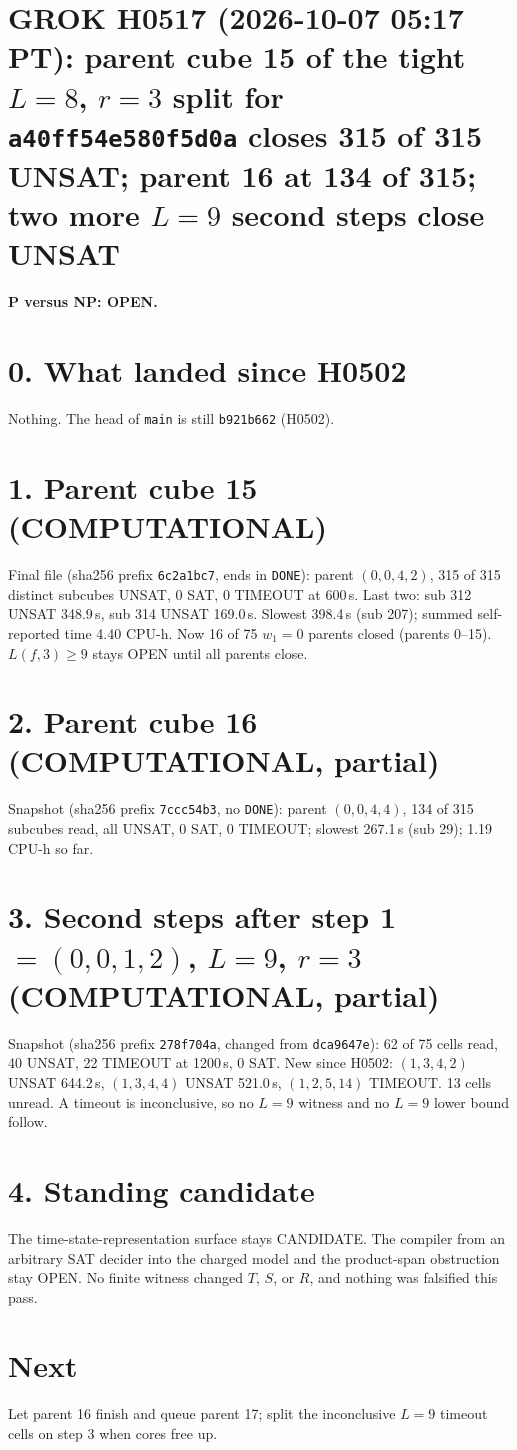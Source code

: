\documentclass[11pt]{article}
\begin{document}
\sloppy
\section*{GROK H0517 (2026-10-07 05:17 PT): parent cube 15 of the tight $L=8$, $r=3$ split for \texttt{a40ff54e580f5d0a} closes 315 of 315 UNSAT; parent 16 at 134 of 315; two more $L=9$ second steps close UNSAT}
\textbf{P versus NP: OPEN.}

\section*{0. What landed since H0502}
Nothing. The head of \texttt{main} is still \texttt{b921b662} (H0502).

\section*{1. Parent cube 15 (COMPUTATIONAL)}
Final file  (sha256 prefix \texttt{6c2a1bc7}, ends in \texttt{DONE}): parent $(0,0,4,2)$, 315 of 315 distinct subcubes UNSAT, 0 SAT, 0 TIMEOUT at 600\,s. Last two: sub 312 UNSAT 348.9\,s, sub 314 UNSAT 169.0\,s. Slowest 398.4\,s (sub 207); summed self-reported time 4.40 CPU-h. Now 16 of 75 $w_1=0$ parents closed (parents 0--15). $L(f,3)\ge 9$ stays OPEN until all parents close.

\section*{2. Parent cube 16 (COMPUTATIONAL, partial)}
Snapshot  (sha256 prefix \texttt{7ccc54b3}, no \texttt{DONE}): parent $(0,0,4,4)$, 134 of 315 subcubes read, all UNSAT, 0 SAT, 0 TIMEOUT; slowest 267.1\,s (sub 29); 1.19 CPU-h so far.

\section*{3. Second steps after step 1 $=(0,0,1,2)$, $L=9$, $r=3$ (COMPUTATIONAL, partial)}
Snapshot  (sha256 prefix \texttt{278f704a}, changed from \texttt{dca9647e}): 62 of 75 cells read, 40 UNSAT, 22 TIMEOUT at 1200\,s, 0 SAT. New since H0502: $(1,3,4,2)$ UNSAT 644.2\,s, $(1,3,4,4)$ UNSAT 521.0\,s, $(1,2,5,14)$ TIMEOUT. 13 cells unread. A timeout is inconclusive, so no $L=9$ witness and no $L=9$ lower bound follow.

\section*{4. Standing candidate}
The time-state-representation surface stays CANDIDATE. The compiler from an arbitrary SAT decider into the charged model and the product-span obstruction stay OPEN. No finite witness changed $T$, $S$, or $R$, and nothing was falsified this pass.

\section*{Next}
Let parent 16 finish and queue parent 17; split the inconclusive $L=9$ timeout cells on step 3 when cores free up.
\end{document}
